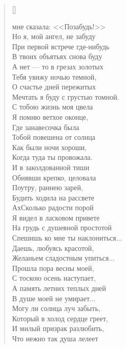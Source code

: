 \newpage
\vspace*{0cm}


\begin{verse}[\versewidth]
\begin{patverse*}
 мне сказала: <<Позабудь!>>\\
Но я, мой ангел, не забуду\ldotst\\
     При первой встрече где-нибудь\\
В твоих объятьях снова буду\ldotst\\
	  А нет --- то в грезах золотых\\
Тебя увижу ночью темной,\\
      О счастье дней пережитых\\
Мечтать я буду с грустью томной.\\
     С тобою жизнь моя цвела\ldotst\\
Я помню ветхое оконце,\\
     Где занавесочка была\\
Тобой повешена от солнца\ldotst\\
     Как были ночи хороши,\\
Когда туда ты провожала.\\
     И в заколдованной тиши\\
Обнявши крепко, целовала\ldotse\\
     Поутру, раннею зарей,\\
Будить ходила на рассвете\ldotst\\
     Ах\ldotst Сколько радости порой\\
Я видел в ласковом привете\ldotse\\
На грудь с душевной простотой\\
Спешишь ко мне ты наклониться...\\
Даешь, любуясь красотой,\\
Желаньем сладостным упиться...\\
Прошла пора весны моей,\\
С тоскою осень наступает,\\
А память летних теплых дней\\
В душе моей не умирает...\\
Могу ли солнца луч забыть,\\
Который в холод сердце греет,\\
И милый призрак разлюбить,\\
Что нежно так душа лелеет\ldotsq
\end{patverse*}
\end{verse}


